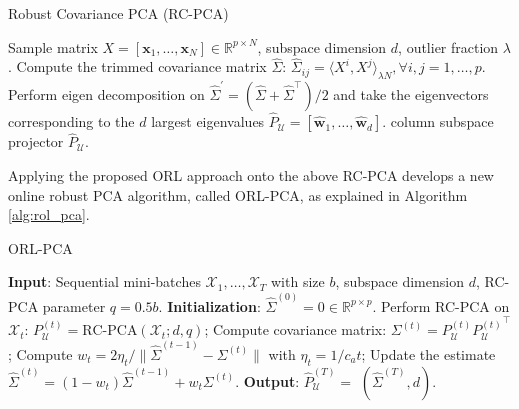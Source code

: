 \documentclass[11pt]{article}
\begin{document}
\begin{algorithm}[h]
	\caption{Robust Covariance PCA (RC-PCA)}
	\label{alg:rpca}
	\begin{algorithmic}
		 Sample matrix $X = [\mathbf{x}_1,\ldots,\mathbf{x}_{N}] \in \mathbb{R}^{p\times N}$, subspace dimension $d$, outlier fraction $\lambda$.
		\STATE Compute the trimmed covariance matrix $\widehat{\Sigma}$:
		$\widehat{\Sigma}_{ij} = \langle X^i,X^j \rangle_{\lambda N},\forall i,j=1,\ldots,p$.
		\STATE Perform eigen decomposition on $\widehat{\Sigma}^\prime = (\widehat{\Sigma} + \widehat{\Sigma}^\top)/2$ and take the eigenvectors corresponding to the  $d$ largest  eigenvalues $\widehat{P}_\mathcal{U} = [\widehat{\mathbf{w}}_1,\ldots,\widehat{\mathbf{w}}_d]$.
		 column subspace projector $\widehat{P}_\mathcal{U}$.
	\end{algorithmic}
\end{algorithm}


Applying the proposed ORL approach onto the above RC-PCA  develops a new online robust PCA algorithm, called ORL-PCA, as explained  in Algorithm \ref{alg:rol_pca}.
\begin{algorithm}[h!]
	\caption{ORL-PCA}
	\label{alg:rol_pca}
	\begin{algorithmic}
		\STATE \textbf{Input}: Sequential mini-batches $\mathcal{X}_1,\ldots,\mathcal{X}_T $ with size $b$, subspace dimension $ d $, {\sc RC-PCA} parameter $ q = 0.5 b $.
		\STATE \textbf{Initialization}: $\widehat{\Sigma}^{(0)} = 0 \in \mathbb{R}^{p \times p}$.
		\FOR{$t=1,\ldots,T$}
		\STATE Perform RC-PCA on $ \mathcal{X}_t $: $ P_\mathcal{U}^{(t)} = {\text{RC-PCA}}(\mathcal{X}_t;d,q) $;
		\STATE Compute covariance matrix: $ \Sigma^{(t)} = P_\mathcal{U}^{(t)} {P_\mathcal{U}^{(t)}}^\top $;
		\STATE Compute $w_t = 2\eta_t/{\|\widehat{\Sigma}^{(t-1)} - \Sigma^{(t)}\|}$ with $\eta_t = 1/c_a t$;
		\STATE Update the estimate $\widehat{\Sigma}^{(t)} = (1-w_t)\widehat{\Sigma}^{(t-1)} + w_t \Sigma^{(t)}$.
		\ENDFOR
		\STATE \textbf{Output}:  $ \widehat{P}_\mathcal{U}^{(T)} =$ $\left(\widehat{\Sigma}^{(T)}, d\right)$.
	\end{algorithmic}
\end{algorithm}
\end{document}
